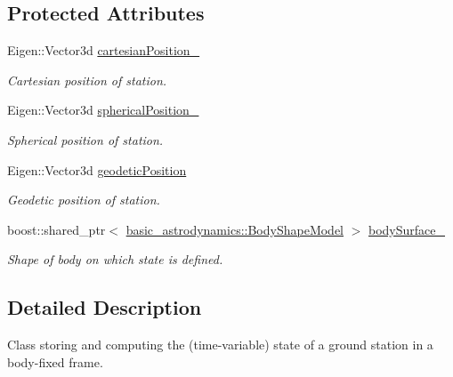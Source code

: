 \subsection*{Protected Attributes}
\begin{DoxyCompactItemize}
\item 
Eigen\+::\+Vector3d \hyperlink{classtudat_1_1ground__stations_1_1GroundStationState_acc4e35ba9f9a797f000eb848982706ba}{cartesian\+Position\+\_\+}
\begin{DoxyCompactList}\small\item\em Cartesian position of station. \end{DoxyCompactList}\item 
Eigen\+::\+Vector3d \hyperlink{classtudat_1_1ground__stations_1_1GroundStationState_aed814dd2ad671f8df67be153d92c1966}{spherical\+Position\+\_\+}
\begin{DoxyCompactList}\small\item\em Spherical position of station. \end{DoxyCompactList}\item 
Eigen\+::\+Vector3d \hyperlink{classtudat_1_1ground__stations_1_1GroundStationState_a2af20fd123b1e5ca703c4ee7c9b25bc8}{geodetic\+Position}
\begin{DoxyCompactList}\small\item\em Geodetic position of station. \end{DoxyCompactList}\item 
boost\+::shared\+\_\+ptr$<$ \hyperlink{classtudat_1_1basic__astrodynamics_1_1BodyShapeModel}{basic\+\_\+astrodynamics\+::\+Body\+Shape\+Model} $>$ \hyperlink{classtudat_1_1ground__stations_1_1GroundStationState_a3c63970e8a21c6d219c443c729ace442}{body\+Surface\+\_\+}\hypertarget{classtudat_1_1ground__stations_1_1GroundStationState_a3c63970e8a21c6d219c443c729ace442}{}\label{classtudat_1_1ground__stations_1_1GroundStationState_a3c63970e8a21c6d219c443c729ace442}

\begin{DoxyCompactList}\small\item\em Shape of body on which state is defined. \end{DoxyCompactList}\end{DoxyCompactItemize}


\subsection{Detailed Description}
Class storing and computing the (time-\/variable) state of a ground station in a body-\/fixed frame. 

